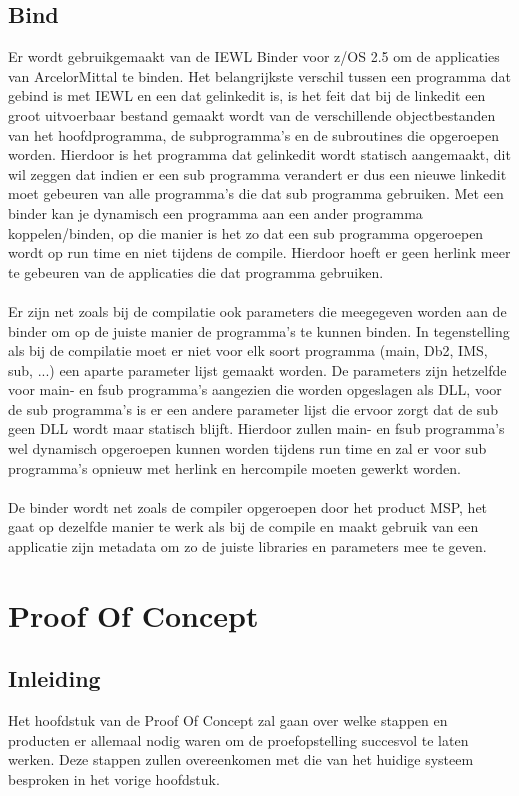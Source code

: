 \section{Bind}
\label{sec:bind}
Er wordt gebruikgemaakt van de IEWL Binder voor z/OS 2.5 om de applicaties van ArcelorMittal te binden. Het belangrijkste verschil tussen een programma dat gebind is met IEWL en een dat gelinkedit is, is het feit dat bij de linkedit een groot uitvoerbaar bestand gemaakt wordt van de verschillende objectbestanden van het hoofdprogramma, de subprogramma's en de subroutines die opgeroepen worden. Hierdoor is het programma dat gelinkedit wordt statisch aangemaakt, dit wil zeggen dat indien er een sub programma verandert er dus een nieuwe linkedit moet gebeuren van alle programma's die dat sub programma gebruiken. Met een binder kan je dynamisch een programma aan een ander programma koppelen/binden, op die manier is het zo dat een sub programma opgeroepen wordt op run time en niet tijdens de compile. Hierdoor hoeft er geen herlink meer te gebeuren van de applicaties die dat programma gebruiken. 
\\ \\
Er zijn net zoals bij de compilatie ook parameters die meegegeven worden aan de binder om op de juiste manier de programma's te kunnen binden. In tegenstelling als bij de compilatie moet er niet voor elk soort programma (main, Db2, IMS, sub, ...) een aparte parameter lijst gemaakt worden. De parameters zijn hetzelfde voor main- en fsub programma's aangezien die worden opgeslagen als DLL, voor de sub programma's is er een andere parameter lijst die ervoor zorgt dat de sub geen DLL wordt maar statisch blijft. Hierdoor zullen main- en fsub programma's wel dynamisch opgeroepen kunnen worden tijdens run time en zal er voor sub programma's opnieuw met herlink en hercompile moeten gewerkt worden. 
\\ \\ 
De binder wordt net zoals de compiler opgeroepen door het product MSP, het gaat op dezelfde manier te werk als bij de compile en maakt gebruik van een applicatie zijn metadata om zo de juiste libraries en parameters mee te geven.

\chapter{Proof Of Concept}
\label{ch:poc}

\section{Inleiding}
\label{sec:inleiding_poc}
Het hoofdstuk van de Proof Of Concept zal gaan over welke stappen en producten er allemaal nodig waren om de proefopstelling succesvol te laten werken. Deze stappen zullen overeenkomen met die van het huidige systeem besproken in het vorige hoofdstuk.
\\ \\

